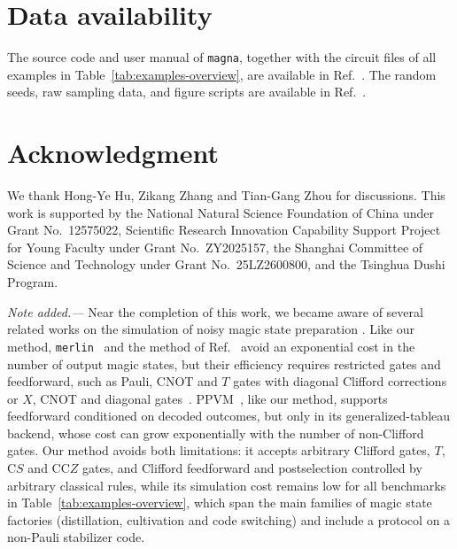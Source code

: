 \documentclass[aps,prx,twocolumn,superscriptaddress,longbibliography]{revtex4-2}
\newcommand{\simname}{\texttt{magna}}
\begin{document}
\section*{Data availability}

The source code and user manual of \simname,
together with the circuit files of all examples in Table~\ref{tab:examples-overview},
are available in Ref.~\cite{magna}.
The random seeds, raw sampling data, and figure scripts are available in Ref.~\cite{magnaData}.

\section*{Acknowledgment}
We thank Hong-Ye Hu, Zikang Zhang and Tian-Gang Zhou for discussions. This work is supported by the National Natural Science Foundation of China under Grant No.~12575022, Scientific Research Innovation Capability Support Project for Young Faculty under Grant No.~ZY2025157, the Shanghai Committee of Science and Technology under Grant No.~25LZ2600800, and the Tsinghua Dushi Program. 

\emph{Note added.---} Near the completion of this work, we became aware of
several related works on the simulation of noisy magic state preparation
\cite{takadaExactEfficientSimulation2026,xiaoEfficientFidelitySimulation2026,cercelescuPolynomialtimeSimulationNonClifford2026,luoPPVMCircuitSimulation2026}.
Like our method, \texttt{merlin}~\cite{cercelescuPolynomialtimeSimulationNonClifford2026}
and the method of Ref.~\cite{xiaoEfficientFidelitySimulation2026}
avoid an exponential cost in the number of output magic states,
but their efficiency requires restricted gates and feedforward,
such as Pauli, CNOT and $T$ gates with diagonal Clifford corrections~\cite{cercelescuPolynomialtimeSimulationNonClifford2026}
or $X$, CNOT and diagonal gates~\cite{xiaoEfficientFidelitySimulation2026}.
PPVM~\cite{luoPPVMCircuitSimulation2026}, like our method,
supports feedforward conditioned on decoded outcomes,
but only in its generalized-tableau backend,
whose cost can grow exponentially with the number of non-Clifford gates.
Our method avoids both limitations:
it accepts arbitrary Clifford gates, $T$, $\mathrm{C}S$ and $\mathrm{CC}Z$ gates,
and Clifford feedforward and postselection controlled by arbitrary classical rules,
while its simulation cost remains low for all benchmarks in Table~\ref{tab:examples-overview},
which span the main families of magic state factories (distillation, cultivation and code switching)
and include a protocol on a non-Pauli stabilizer code.



\end{document}
